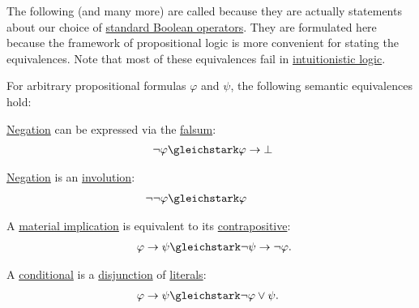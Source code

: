 \begin{proposition}\label{thm:boolean_equivalences}
  The following (and many more) are called  because they are actually statements about our choice of \hyperref[def:standard_boolean_operators]{standard Boolean operators}. They are formulated here because the framework of propositional logic is more convenient for stating the equivalences. Note that most of these equivalences fail in \hyperref[def:intuitionistic_propositional_axiomatic_derivation_system]{intuitionistic logic}.

  For arbitrary propositional formulas \( \varphi \) and \( \psi \), the following semantic equivalences hold:
  \begin{thmenum}
     \hyperref[def:propositional_language/negation]{Negation} can be expressed via the \hyperref[def:propositional_language/constants/falsum]{falsum}:
    \begin{equation}\label{eq:thm:boolean_equivalences/negation_bottom}
      \begin{split}
        \mathllap{\neg \varphi} &\gleichstark \mathrlap{\varphi \rightarrow \bot}.
      \end{split}
    \end{equation}

     \hyperref[def:propositional_language/negation]{Negation} is an \hyperref[def:function/involution]{involution}:
    \begin{equation}\label{eq:thm:boolean_equivalences/double_negation}
      \begin{split}
        \mathllap{\neg \neg \varphi} &\gleichstark \mathrlap{\varphi}.
      \end{split}
    \end{equation}

     A \hyperref[def:material_implication]{material implication} is equivalent to its \hyperref[def:material_implication/contrapositive]{contrapositive}:
    \begin{equation}\label{eq:thm:boolean_equivalences/contrapositive}
      \begin{split}
        \mathllap{\varphi \rightarrow \psi} &\gleichstark \mathrlap{\neg \psi \rightarrow \neg \varphi.}
      \end{split}
    \end{equation}

     A \hyperref[def:propositional_language/connectives/conditional]{conditional} is a \hyperref[def:propositional_language/connectives/disjunction]{disjunction} of \hyperref[def:conjunctive_disjunctive_normal_form/literal]{literals}:
    \begin{equation}\label{eq:thm:boolean_equivalences/conditional_cnf}
      \begin{split}
        \mathllap{\varphi \rightarrow \psi} &\gleichstark \mathrlap{ \neg \varphi \vee \psi. }
      \end{split}
    \end{equation}


\end{thmenum}
\end{proposition}
